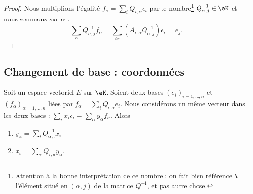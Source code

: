 \begin{proof}
	Nous multiplions l'égalité \( f_{\alpha}=\sum_i Q_{i,\alpha}e_i\) par le nombre\footnote{Attention à la bonne interprétation de ce nombre : on fait bien référence à l'élément situé en \( (\alpha, j) \) de la matrice \( Q^{-1} \), et pas autre chose.} \( Q^{-1}_{\alpha, j}\in \eK\)  et nous sommons sur \( \alpha\) :
	\begin{equation}
		\sum_{\alpha}Q^{-1}_{\alpha, j}f_{\alpha}=\sum_{i\alpha}(A_{i,\alpha}Q^{-1}_{\alpha, j})e_i=e_j.
	\end{equation}
\end{proof}

\subsection{Changement de base : coordonnées}

\begin{proposition}     \label{PROPooNYYOooHqHryX}
	Soit un espace vectoriel \( E\) sur \( \eK\). Soient deux bases \( (e_i)_{i=1,\ldots, n}\) et \( (f_{\alpha})_{\alpha=1,\ldots, n}\) liées par \( f_{\alpha}=\sum_i Q_{i,\alpha}e_i\). Nous considérons un même vecteur dans les deux bases : \( \sum_i x_ie_i=\sum_{\alpha}y_{\alpha}f_{\alpha}\). Alors
	\begin{enumerate}
		\item       \label{ITEMooIBAEooNaUnPD}
		      \( y_{\alpha}=\sum_i Q^{-1}_{\alpha, i}x_i\)
		\item       \label{ITEMooKPWTooMwdbPu}
		      \( x_i=\sum_{\alpha} Q_{i,\alpha}y_{\alpha}\).
	\end{enumerate}
\end{proposition}

